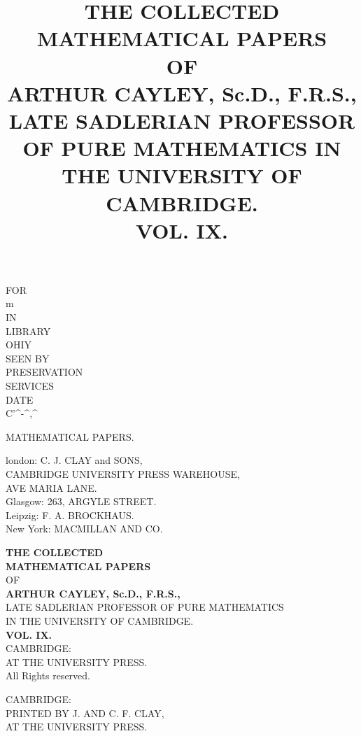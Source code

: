 \documentclass[12pt,a4paper]{article}
\title{\textbf{THE COLLECTED MATHEMATICAL PAPERS}\\[6pt] \large OF\\[6pt] \textbf{ARTHUR CAYLEY, Sc.D., F.R.S.,}\\[4pt] \footnotesize LATE SADLERIAN PROFESSOR OF PURE MATHEMATICS IN THE UNIVERSITY OF CAMBRIDGE.\\[12pt] \large \textbf{VOL. IX.}}
\author{}
\date{}
\theoremstyle{plain}
\theoremstyle{definition}
\begin{document}

\thispagestyle{empty}

\begin{center}

\vspace*{2cm}

{\Large FOR}\\[8pt]
{\large m}\\[8pt]
{\Large IN}\\[8pt]
{\Large LIBRARY}\\[8pt]
{\Large OHIY}\\[12pt]
{\large SEEN BY}\\[8pt]
{\Large PRESERVATION}\\[8pt]
{\Large SERVICES}\\[8pt]
{\large DATE}\\[16pt]
{\Large C'\^{}-\^{},\^{}}

\vfill
\newpage

{\Large MATHEMATICAL PAPERS.}

\vfill
\newpage

{\Large london: C. J. CLAY and SONS,}\\[6pt]
\normalsize CAMBRIDGE UNIVERSITY PRESS WAREHOUSE,\\
AVE MARIA LANE.\\[6pt]
Glasgow: 263, ARGYLE STREET.\\[6pt]
Leipzig: F. A. BROCKHAUS.\\[6pt]
New York: MACMILLAN AND CO.

\vfill
\newpage

\vspace*{3cm}

{\Large \textbf{THE COLLECTED}}\\[8pt]
{\Large \textbf{MATHEMATICAL PAPERS}}\\[12pt]
{\large OF}\\[12pt]
{\Large \textbf{ARTHUR CAYLEY, Sc.D., F.R.S.,}}\\[8pt]
\normalsize LATE SADLERIAN PROFESSOR OF PURE MATHEMATICS\\
IN THE UNIVERSITY OF CAMBRIDGE.\\[20pt]
{\Large \textbf{VOL. IX.}}\\[30pt]
{\Large CAMBRIDGE:}\\[6pt]
{\large AT THE UNIVERSITY PRESS.}\\[12pt]
{\small All Rights reserved.}

\vfill
\newpage

\vspace*{6cm}

{\large CAMBRIDGE:}\\[6pt]
PRINTED BY J. AND C. F. CLAY,\\
AT THE UNIVERSITY PRESS.

\end{center}
\end{document}

